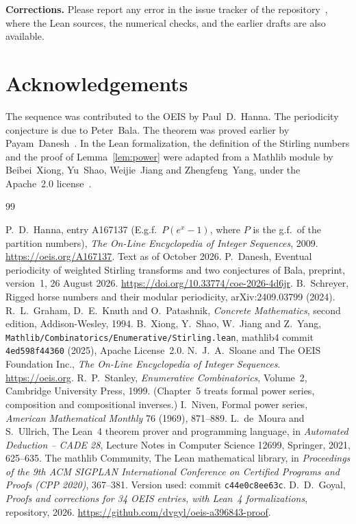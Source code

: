 \documentclass[11pt,a4paper]{article}
\theoremstyle{definition}
\theoremstyle{remark}
\newcommand{\para}[1]{\par\medskip\noindent\textbf{#1}\enspace}
\begin{document}
\para{Corrections.} Please report any error in the issue tracker of the repository~\cite{repo}, where the Lean
sources, the numerical checks, and the earlier drafts are also available.

\section*{Acknowledgements}
The sequence was contributed to the OEIS by Paul~D.~Hanna. The periodicity conjecture is due to Peter~Bala. The theorem was proved earlier by
Payam~Danesh~\cite{danesh}. In the Lean formalization, the definition of the Stirling numbers and the proof of
Lemma~\ref{lem:power} were adapted from a Mathlib module by Beibei~Xiong, Yu~Shao, Weijie~Jiang and Zhengfeng~Yang, under
the Apache~2.0 license~\cite{stirlingmathlib}.

\begin{thebibliography}{99}\small
\raggedright
{} P.~D.~Hanna, entry A167137 (E.g.f.\ $P(e^x-1)$, where $P$ is the g.f.\ of the partition numbers), \emph{The On-Line Encyclopedia of Integer Sequences}, 2009. \url{https://oeis.org/A167137}. Text as of October 2026.
 P.~Danesh, Eventual periodicity of weighted Stirling transforms and two conjectures of Bala, preprint, version~1, 26 August 2026. \url{https://doi.org/10.33774/coe-2026-4d6jr}.
 B.~Schreyer, Rigged horse numbers and their modular periodicity, arXiv:2409.03799 (2024).
 R.~L.~Graham, D.~E.~Knuth and O.~Patashnik, \emph{Concrete Mathematics}, second edition, Addison-Wesley, 1994.
 B.~Xiong, Y.~Shao, W.~Jiang and Z.~Yang, \texttt{Mathlib/Combinatorics/Enumerative/Stirling.lean}, mathlib4 commit \texttt{4ed598f44360} (2025), Apache License~2.0.
 N.~J.~A.~Sloane and The OEIS Foundation Inc., \emph{The On-Line Encyclopedia of Integer Sequences}. \url{https://oeis.org}.
 R.~P.~Stanley, \emph{Enumerative Combinatorics}, Volume~2, Cambridge University Press, 1999. (Chapter~5 treats formal power series, composition and compositional inverses.)
 I.~Niven, Formal power series, \emph{American Mathematical Monthly} 76 (1969), 871--889.
 L.~de~Moura and S.~Ullrich, The Lean~4 theorem prover and programming language, in \emph{Automated Deduction -- CADE 28}, Lecture Notes in Computer Science 12699, Springer, 2021, 625--635.
 The mathlib Community, The Lean mathematical library, in \emph{Proceedings of the 9th ACM SIGPLAN International Conference on Certified Programs and Proofs (CPP 2020)}, 367--381. Version used: commit \texttt{c44e0c8ee63c}.
 D.~D.~Goyal, \emph{Proofs and corrections for 34 OEIS entries, with Lean~4 formalizations}, repository, 2026. \url{https://github.com/dvgyl/oeis-a396843-proof}.
\end{thebibliography}
\end{document}
